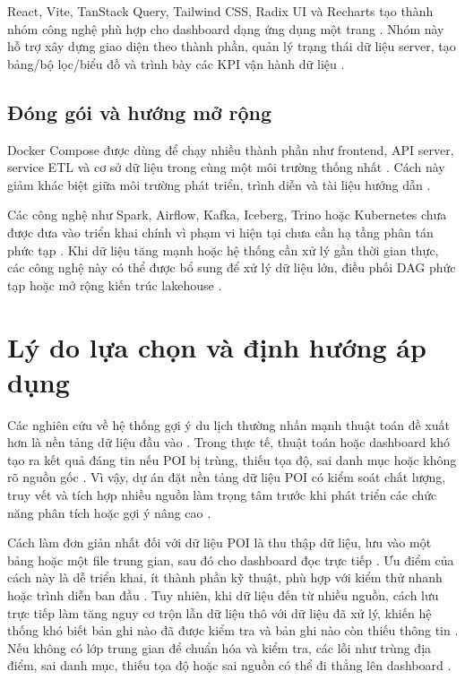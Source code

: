 React, Vite, TanStack Query, Tailwind CSS, Radix UI và Recharts tạo thành nhóm công nghệ phù hợp cho dashboard dạng ứng dụng một trang \cite{reactDocs}. Nhóm này hỗ trợ xây dựng giao diện theo thành phần, quản lý trạng thái dữ liệu server, tạo bảng/bộ lọc/biểu đồ và trình bày các KPI vận hành dữ liệu \cite{tableauKpi}.\par

\subsection{Đóng gói và hướng mở rộng}

Docker Compose được dùng để chạy nhiều thành phần như frontend, API server, service ETL và cơ sở dữ liệu trong cùng một môi trường thống nhất \cite{dockerCompose}. Cách này giảm khác biệt giữa môi trường phát triển, trình diễn và tài liệu hướng dẫn \cite{dockerMultiContainer}.\par

Các công nghệ như Spark, Airflow, Kafka, Iceberg, Trino hoặc Kubernetes chưa được đưa vào triển khai chính vì phạm vi hiện tại chưa cần hạ tầng phân tán phức tạp \cite{sparkDocs}. Khi dữ liệu tăng mạnh hoặc hệ thống cần xử lý gần thời gian thực, các công nghệ này có thể được bổ sung để xử lý dữ liệu lớn, điều phối DAG phức tạp hoặc mở rộng kiến trúc lakehouse \cite{airflowDocs}.\par

\section{Lý do lựa chọn và định hướng áp dụng}

Các nghiên cứu về hệ thống gợi ý du lịch thường nhấn mạnh thuật toán đề xuất hơn là nền tảng dữ liệu đầu vào \cite{zhang2023}. Trong thực tế, thuật toán hoặc dashboard khó tạo ra kết quả đáng tin nếu POI bị trùng, thiếu tọa độ, sai danh mục hoặc không rõ nguồn gốc \cite{ibmDataQuality}. Vì vậy, dự án đặt nền tảng dữ liệu POI có kiểm soát chất lượng, truy vết và tích hợp nhiều nguồn làm trọng tâm trước khi phát triển các chức năng phân tích hoặc gợi ý nâng cao \cite{zhang2023}.\par


Cách làm đơn giản nhất đối với dữ liệu POI là thu thập dữ liệu, lưu vào một bảng hoặc một file trung gian, sau đó cho dashboard đọc trực tiếp \cite{ibmETL}. Ưu điểm của cách này là dễ triển khai, ít thành phần kỹ thuật, phù hợp với kiểm thử nhanh hoặc trình diễn ban đầu \cite{ibmETL}. Tuy nhiên, khi dữ liệu đến từ nhiều nguồn, cách lưu trực tiếp làm tăng nguy cơ trộn lẫn dữ liệu thô với dữ liệu đã xử lý, khiến hệ thống khó biết bản ghi nào đã được kiểm tra và bản ghi nào còn thiếu thông tin \cite{ibmDataQuality}. Nếu không có lớp trung gian để chuẩn hóa và kiểm tra, các lỗi như trùng địa điểm, sai danh mục, thiếu tọa độ hoặc sai nguồn có thể đi thẳng lên dashboard \cite{yeboah2021}.\par

